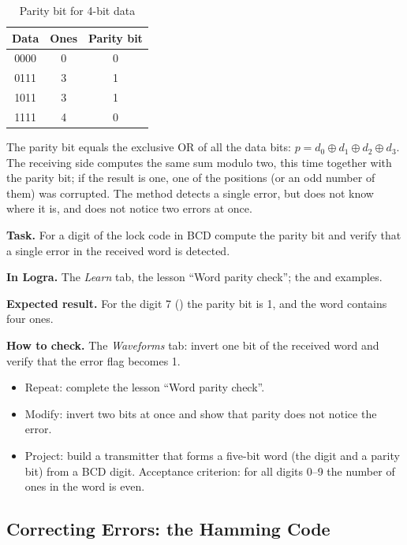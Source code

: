 \begin{table}[H]
\centering
\caption{Parity bit for 4-bit data}
\small
\begin{tabular}{ccc}
\toprule
\textbf{Data} & \textbf{Ones} & \textbf{Parity bit} \\
\midrule
0000 & 0 & 0 \\
0111 & 3 & 1 \\
1011 & 3 & 1 \\
1111 & 4 & 0 \\
\bottomrule
\end{tabular}
\end{table}

The parity bit equals the exclusive OR of all the data bits: $p = d_0 \oplus d_1
\oplus d_2 \oplus d_3$. The receiving side computes the same sum modulo two,
this time together with the parity bit; if the result is one, one of the positions (or an
odd number of them) was corrupted. The method detects a single error, but does not know
where it is, and does not notice two errors at once.

\begin{diybox}
\textbf{Task.} For a digit of the lock code in BCD compute the parity bit and
verify that a single error in the received word is detected.\par
\textbf{In Logra.} The \emph{Learn} tab, the lesson ``Word parity check'';
the  and  examples.\par
\textbf{Expected result.} For the digit 7 () the parity bit is 1,
and the word  contains four ones.\par
\textbf{How to check.} The \emph{Waveforms} tab: invert one bit of the
received word and verify that the error flag becomes 1.
\begin{itemize}[leftmargin=3.4em,labelwidth=3em,labelsep=0.4em,align=left]
  \item[\stars{1}] Repeat: complete the lesson ``Word parity check''.
  \item[\stars{2}] Modify: invert two bits at once and show that parity
    does not notice the error.
  \item[\stars{3}] Project: build a transmitter that forms a
    five-bit word (the digit and a parity bit) from a BCD digit. Acceptance criterion: for
    all digits 0--9 the number of ones in the word is even.
\end{itemize}
\end{diybox}

\subsection{Correcting Errors: the Hamming Code}

